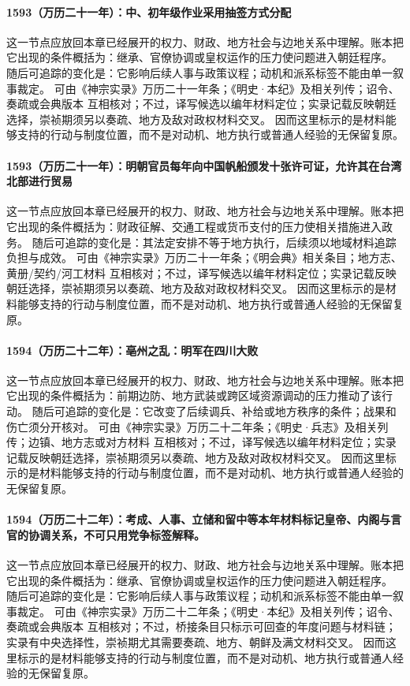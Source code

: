 \paragraph{1593（万历二十一年）：中、初年级作业采用抽签方式分配} 这一节点应放回本章已经展开的权力、财政、地方社会与边地关系中理解。账本把它出现的条件概括为：继承、官僚协调或皇权运作的压力使问题进入朝廷程序。 随后可追踪的变化是：它影响后续人事与政策议程；动机和派系标签不能由单一叙事裁定。 可由《神宗实录》万历二十一年条；《明史·本纪》及相关列传；诏令、奏疏或会典版本 互相核对；不过，译写候选以编年材料定位；实录记载反映朝廷选择，崇祯期须另以奏疏、地方及敌对政权材料交叉。 因而这里标示的是材料能够支持的行动与制度位置，而不是对动机、地方执行或普通人经验的无保留复原。

\paragraph{1593（万历二十一年）：明朝官员每年向中国帆船颁发十张许可证，允许其在台湾北部进行贸易} 这一节点应放回本章已经展开的权力、财政、地方社会与边地关系中理解。账本把它出现的条件概括为：财政征解、交通工程或货币支付的压力使相关措施进入政务。 随后可追踪的变化是：其法定安排不等于地方执行，后续须以地域材料追踪负担与成效。 可由《神宗实录》万历二十一年条；《明会典》相关条目；地方志、黄册/契约/河工材料 互相核对；不过，译写候选以编年材料定位；实录记载反映朝廷选择，崇祯期须另以奏疏、地方及敌对政权材料交叉。 因而这里标示的是材料能够支持的行动与制度位置，而不是对动机、地方执行或普通人经验的无保留复原。

\paragraph{1594（万历二十二年）：亳州之乱：明军在四川大败} 这一节点应放回本章已经展开的权力、财政、地方社会与边地关系中理解。账本把它出现的条件概括为：前期边防、地方武装或跨区域资源调动的压力推动了该行动。 随后可追踪的变化是：它改变了后续调兵、补给或地方秩序的条件；战果和伤亡须分开核对。 可由《神宗实录》万历二十二年条；《明史·兵志》及相关列传；边镇、地方志或对方材料 互相核对；不过，译写候选以编年材料定位；实录记载反映朝廷选择，崇祯期须另以奏疏、地方及敌对政权材料交叉。 因而这里标示的是材料能够支持的行动与制度位置，而不是对动机、地方执行或普通人经验的无保留复原。

\paragraph{1594（万历二十二年）：考成、人事、立储和留中等本年材料标记皇帝、内阁与言官的协调关系，不可只用党争标签解释。} 这一节点应放回本章已经展开的权力、财政、地方社会与边地关系中理解。账本把它出现的条件概括为：继承、官僚协调或皇权运作的压力使问题进入朝廷程序。 随后可追踪的变化是：它影响后续人事与政策议程；动机和派系标签不能由单一叙事裁定。 可由《神宗实录》万历二十二年条；《明史·本纪》及相关列传；诏令、奏疏或会典版本 互相核对；不过，桥接条目只标示可回查的年度问题与材料链；实录有中央选择性，崇祯期尤其需要奏疏、地方、朝鲜及满文材料交叉。 因而这里标示的是材料能够支持的行动与制度位置，而不是对动机、地方执行或普通人经验的无保留复原。

